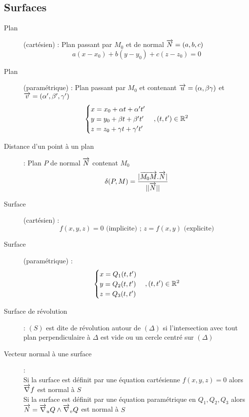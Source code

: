 \subsection{Surfaces}
\begin{description}
\item[Plan] (cartésien) : Plan passant par $M_0$ et de normal $\overrightarrow{N}=(a,b,c)$
    \[
        a(x-x_0)+b(y-y_0)+c(z-z_0)=0
    \]
\item[Plan] (paramétrique) : Plan passant par $M_0$ et contenant $\overrightarrow{u} = (\alpha,\beta\gamma)$ et $\overrightarrow{v}=(\alpha',\beta',\gamma')$
    \[
        \begin{cases}
            x=x_0+\alpha t+\alpha't'\\
            y=y_0+\beta t+\beta't'\\
            z=z_0+\gamma t+\gamma't'
        \end{cases}, (t,t')\in\mathbb{R}^2
    \]
\item[Distance d'un point à un plan] : Plan $P$ de normal $\overrightarrow{N}$ contenat $M_0$
    \[
        \delta(P,M)=\frac{|\overrightarrow{M_0M}.\overrightarrow{N}|}{||\overrightarrow{N}||}
    \]
\item[Surface] (cartésien) :
    \[
        f(x,y,z)=0\textrm{ (implicite) ; }
        z=f(x,y)\textrm{ (explicite)}
    \]
\item[Surface] (paramétrique) :
    \[
        \begin{cases}
            x=Q_1(t,t')\\
            y=Q_2(t,t')\\
            z=Q_3(t,t')
        \end{cases}, (t,t')\in\mathbb{R}^2
    \]
\item[Surface de révolution] : $(S)$ est dite de révolution autour de $(\Delta)$ si l’intersection avec tout plan perpendiculaire à $\Delta$ est vide ou un cercle centré sur $(\Delta)$
\item[Vecteur normal à une surface] :\\
    Si la surface est définit par une équation cartésienne $f(x,y,z)=0$ alors $\overrightarrow{\nabla} f$ est normal à $S$\\
    Si la surface est définit par une équation paramétrique en $Q_1,Q_2,Q_3$ alors $\overrightarrow{N}=\overrightarrow{\nabla}_u Q\land\overrightarrow{\nabla}_v Q$ est normal à $S$
\end{description}
